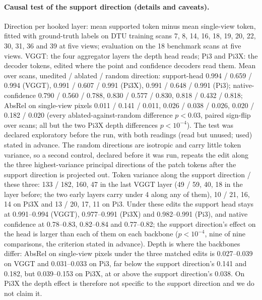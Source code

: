 \paragraph{Causal test of the support direction (details and caveats).}
Direction per hooked layer: mean supported token minus mean single-view token, fitted with ground-truth labels on DTU training scans 7, 8, 14, 16, 18, 19, 20, 22, 30, 31, 36 and 39 at five views; evaluation on the 18 benchmark scans at five views. VGGT: the four aggregator layers the depth head reads; Pi3 and Pi3X: the decoder tokens, edited where the point and confidence decoders read them. Mean over scans, unedited / ablated / random direction: support-head \auroc{} 0.994 / 0.659 / 0.994 (VGGT), 0.991 / 0.607 / 0.991 (Pi3X), 0.991 / 0.648 / 0.991 (Pi3); native-confidence \auroc{} 0.790 / 0.560 / 0.788, 0.830 / 0.577 / 0.830, 0.818 / 0.432 / 0.818; AbsRel on single-view pixels 0.011 / 0.141 / 0.011, 0.026 / 0.038 / 0.026, 0.020 / 0.182 / 0.020 (every ablated-against-random difference $p<0.03$, paired sign-flip over scans; all but the two Pi3X depth differences $p<10^{-4}$). The test was declared exploratory before the run, with both readings (read but unused; used) stated in advance. The random directions are isotropic and carry little token variance, so a second control, declared before it was run, repeats the edit along the three highest-variance principal directions of the patch tokens after the support direction is projected out. Token variance along the support direction / these three: 133 / 182, 160, 47 in the last VGGT layer (49 / 59, 40, 18 in the layer before; the two early layers carry under 4 along any of them), 10 / 21, 16, 14 on Pi3X and 13 / 20, 17, 11 on Pi3. Under these edits the support head stays at \auroc{} 0.991--0.994 (VGGT), 0.977--0.991 (Pi3X) and 0.982--0.991 (Pi3), and native confidence at 0.78--0.83, 0.82--0.84 and 0.77--0.82; the support direction's effect on the head is larger than each of them on each backbone ($p<10^{-4}$, nine of nine comparisons, the criterion stated in advance). Depth is where the backbones differ: AbsRel on single-view pixels under the three matched edits is 0.027--0.039 on VGGT and 0.031--0.033 on Pi3, far below the support direction's 0.141 and 0.182, but 0.039--0.153 on Pi3X, at or above the support direction's 0.038. On Pi3X the depth effect is therefore not specific to the support direction and we do not claim it.

